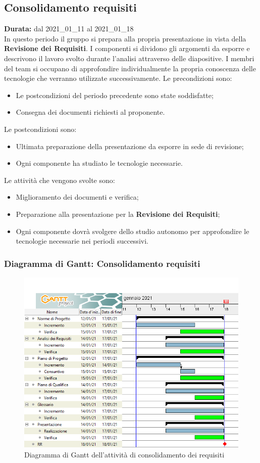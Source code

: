 \subsection{Consolidamento requisiti}
\label{consolidamento_requisiti}
\textbf{Durata:} dal 2021\_01\_11 al 2021\_01\_18\\
In questo periodo il gruppo si prepara alla propria presentazione in vista della \textbf{Revisione dei Requisiti}.
I componenti si dividono gli argomenti da esporre e descrivono il lavoro svolto durante l'analisi attraverso delle diapositive.
I membri del team si occupano di approfondire individualmente la propria conoscenza delle tecnologie che verranno utilizzate successivamente.
Le precondizioni sono:
\begin{itemize}
    \item Le postcondizioni del periodo precedente sono state soddisfatte;
    \item Consegna dei documenti richiesti al proponente.
\end{itemize}
Le postcondizioni sono:
\begin{itemize}
    \item Ultimata preparazione della presentazione da esporre in sede di revisione;
    \item Ogni componente ha studiato le tecnologie necessarie.
\end{itemize}
Le attività che vengono svolte sono:
\begin{itemize}
    \item Miglioramento dei documenti e verifica;
    \item Preparazione alla presentazione per la \textbf{Revisione dei Requisiti};
    \item Ogni componente dovrà svolgere dello studio autonomo per approfondire le tecnologie necessarie nei periodi successivi.  
\end{itemize}
\newpage
\subsubsection{Diagramma di Gantt: Consolidamento requisiti}
\begin{figure}[ht]
    \centering
    \includegraphics[width=\textwidth]{Immagini/GanttConsolidamentoRequisiti}
    \caption{Diagramma di Gantt dell'attività di consolidamento dei requisiti}
\end{figure}